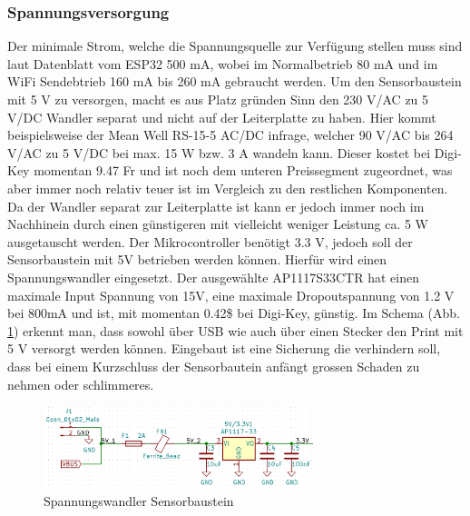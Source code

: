 \subsubsection{Spannungsversorgung}
Der minimale Strom, welche die Spannungsquelle zur Verfügung stellen muss sind laut Datenblatt vom ESP32 500 mA, wobei im Normalbetrieb 80 mA und im WiFi Sendebtrieb 160 mA bis 260 mA gebraucht werden.
Um den Sensorbaustein mit 5 V zu versorgen, macht es aus Platz gründen Sinn den 230 V/AC zu 5 V/DC Wandler separat und nicht auf der Leiterplatte zu haben. Hier kommt beispielsweise der Mean Well RS-15-5 AC/DC infrage, welcher 90 V/AC bis 264 V/AC zu 5 V/DC bei max. 15 W bzw. 3 A wandeln kann. Dieser kostet bei Digi-Key momentan 9.47 Fr und ist noch dem unteren Preissegment zugeordnet, was aber immer noch relativ teuer ist im Vergleich zu den restlichen Komponenten. Da der Wandler separat zur Leiterplatte ist kann er jedoch immer noch im Nachhinein durch einen günstigeren mit vielleicht weniger Leistung ca. 5 W ausgetauscht werden.
Der Mikrocontroller benötigt 3.3 V, jedoch soll der Sensorbaustein mit 5V betrieben werden können. Hierfür wird einen Spannungswandler eingesetzt. Der ausgewählte AP1117S33CTR hat einen maximale Input Spannung von 15V, eine maximale Dropoutspannung von 1.2 V bei 800mA und ist, mit momentan 0.42\$ bei Digi-Key, günstig. Im Schema (Abb. \ref{pic: Wandler_Sensor}) erkennt man, dass sowohl über USB wie auch über einen Stecker den Print mit 5 V versorgt werden können. Eingebaut ist eine Sicherung die verhindern soll, dass bei einem Kurzschluss der Sensorbautein anfängt grossen Schaden zu nehmen oder schlimmeres.
\begin{figure}[h!]
	\centering
	\includegraphics[width=0.7\textwidth]{graphics/shematics_sensor_33V.png}
	\caption{Spannungswandler Sensorbaustein}
	\label{pic: Wandler_Sensor}
\end{figure}
